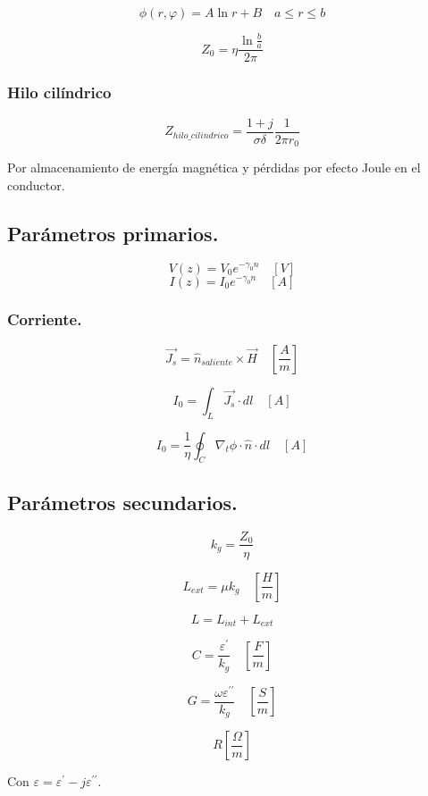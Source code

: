 \documentclass[12pt,a4paper]{article}
\begin{document}
\[ \phi (r,\varphi) = A \ln{r} +B \quad a \leq r \leq b \]

\[ Z_0 = \eta \frac{\ln{\frac{b}{a}}}{2\pi} \]

\subsubsection{Hilo cilíndrico}%
\label{ssub:hilo_cilindrico}

\[ Z_{hilo\_cilindrico} = \frac{1+j}{\sigma \delta} \frac{1}{2 \pi r_0} \]

Por almacenamiento de energía magnética y pérdidas por efecto Joule en el
conductor.

\subsection{Parámetros primarios.}
\label{sub:parametros_primarios}

\[ V(z) = V_0 e^{- \gamma_0 n} \quad [V] \]
\[ I(z) = I_0 e^{- \gamma_0 n} \quad [A] \]

\subsubsection{Corriente.}
\label{ssub:corriente}

\[ \vec{J_s} = \hat{n}_{saliente} \times \vec{H} \quad \left[\frac{A}{m}\right] \]

\[ I_0 = \int_L \vec{J_s} \cdot dl \quad [A] \]

\[ I_0 = \frac{1}{\eta} \oint_C \nabla_t \phi \cdot \hat{n} \cdot dl \quad [A] \]

\subsection{Parámetros secundarios.}
\label{sub:parametros_secundarios}

\[ k_g = \frac{Z_0}{\eta} \]

\[ L_{ext} = \mu k_g \quad \left[ \frac{H}{m} \right] \]

\[ L = L_{int} + L_{ext} \]

\[ C = \frac{\varepsilon^{\prime}}{k_g} \quad \left[ \frac{F}{m} \right] \]

\[ G = \frac{\omega \varepsilon^{\prime\prime}}{k_g} \quad \left[ \frac{S}{m} \right] \]

\[ R \left[ \frac{\Omega}{m} \right] \]

Con $ \varepsilon = \varepsilon^{\prime} -j\varepsilon^{\prime\prime} $.
\end{document}
